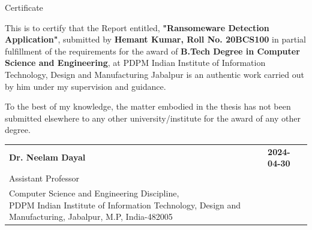 \documentclass[12pt,twocolumn]{article}
\begin{document}


\begin{titlepage}
    \begin{center}
        \vspace*{1cm}
        
        {\englishtowne \LARGE Certificate}
        
        \vspace{1.2cm}
        
       \large This is to certify that the Report entitled, \textbf{"Ransomeware Detection Application"}, submitted by \textbf{Hemant Kumar, Roll No. 20BCS100} in partial fulfillment of the requirements for the award of \textbf{ B.Tech Degree in Computer Science and Engineering}, at PDPM Indian Institute of Information Technology, Design and Manufacturing Jabalpur is an authentic work carried out by him under my supervision and guidance.
    
    
        To the best of my knowledge, the matter embodied in the thesis has not been submitted elsewhere to any other university/institute for the award of any other degree.
        
        \vfill %

         
    \noindent
    \begin{tabular}{@{}ll@{}}
        \textbf{Dr. Neelam Dayal} & \hfill\textbf{{{2024-04-30}}} \\
        \large Assistant Professor & \\
        \parbox[t]{0.7\textwidth}{%
            Computer Science and Engineering Discipline, \\
            PDPM Indian Institute of Information Technology, Design and Manufacturing, Jabalpur, M.P, India-482005
        }
    \end{tabular}



       \vspace{2cm}
        
    \end{center}
\end{titlepage}



\end{document}
